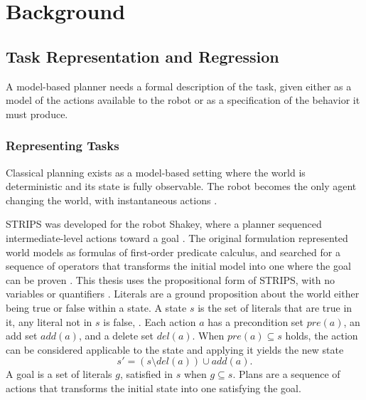 \chapter{Background}
\section{Task Representation and Regression}
\label{sec:task_planning}
    A model-based planner needs a formal description of the task, given either as a model of the actions available to the robot or as a specification of the behavior it must produce.
    
    \subsection{Representing Tasks}
    \label{subsec:tp_classical}
    Classical planning exists as a model-based setting where the world is deterministic and its state is fully observable. 
    The robot becomes the only agent changing the world, with instantaneous actions \cite{karpas2020}.

    STRIPS was developed for the robot Shakey, where a planner sequenced intermediate-level actions toward a goal \cite{fikes1971, nilsson1984}.
    The original formulation represented world models as formulas of first-order predicate calculus, and searched for a sequence of operators that transforms the initial model into one where the goal can be proven \cite{fikes1971}.
    This thesis uses the propositional form of STRIPS, with no variables or quantifiers \cite{karpas2020, cai2021}.
    Literals are a ground proposition about the world either being true or false within a state.
    A state $s$ is the set of literals that are true in it, any literal not in $s$ is false, \cite{fikes1971, cai2021}.
    Each action $a$ has a precondition set $pre(a)$, an add set $add(a)$, and a delete set $del(a)$.
    When $pre(a) \subseteq s$ holds, the action can be considered applicable to the state and applying it yields the new state
    \begin{equation}
        s' = (s \setminus del(a)) \cup add(a).
        \label{eq:strips_transition}
    \end{equation}
    A goal is a set of literals $g$, satisfied in $s$ when $g \subseteq s$.
    Plans are a sequence of actions that transforms the initial state into one satisfying the goal.

